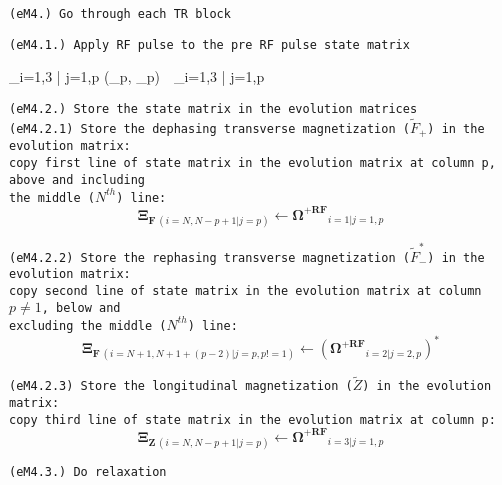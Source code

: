 \begin{algorithm}
    \LinesNumberedHidden

    \nonl \texttt{(eM4.) Go through each TR block} \\
    \nonl {} {
        \nonl \texttt{(eM4.1.) Apply RF pulse to the pre RF pulse state matrix }
        \begin{flalign*}
            _{i=1,3 | j=1,p} \gets {}(\phi_p, \alpha_p)  \,\, _{i=1,3 | j=1,p}
        \end{flalign*}
        
        \nonl \texttt{(eM4.2.) Store the state matrix in the evolution matrices} \\
        
            \nonl \quad \quad \texttt{(eM4.2.1) Store the dephasing transverse magnetization ($\widetilde{F}_+$) in the evolution matrix:} \\
            \nonl \quad \quad \texttt{copy first line of state matrix in the evolution matrix at column p, above and including}\\
            \nonl \quad \quad \texttt{the middle ($N^{th}$) line:} 
            \nonl \[ \bm{\Xi}_{\bm{F} \, (i=N,N-p+1 | j=p)}  \gets \bm{\Omega^{+RF}}_{i=1 | j=1,p} \]
            
            \nonl \quad \quad \texttt{(eM4.2.2) Store the rephasing transverse magnetization ($\widetilde{F}_-^*$) in the evolution matrix:}\\
            \nonl \quad \quad \texttt{copy second line of state matrix in the evolution matrix at column $p \neq 1$, below and }\\
            \nonl \quad \quad \texttt{excluding the middle ($N^{th}$) line:} 
            \nonl \[ \bm{\Xi}_{\bm{F} \, (i=N+1,N+1+(p-2) | j=p, p!=1)}  \gets (\bm{\Omega^{+RF}}_{i=2 | j=2,p})^* \]
        
            \nonl \quad \quad \texttt{(eM4.2.3) Store the longitudinal magnetization ($\widetilde{Z}$) in the evolution matrix:}\\
            \nonl \quad \quad \texttt{copy third line of state matrix in the evolution matrix at column p:} 
            \nonl \[ \bm{\Xi}_{\bm{Z} \, (i=N,N-p+1 | j=p)}  \gets \bm{\Omega^{+RF}}_{i=3 | j=1,p} \]
        
        \nonl \texttt{(eM4.3.) Do relaxation}\\
            
}
\end{algorithm}
